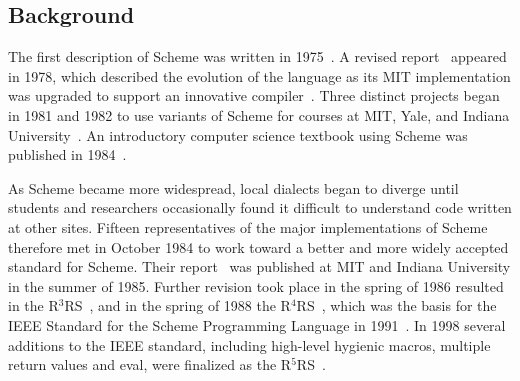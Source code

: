 \subsection*{Background}

\vest The first description of Scheme was written in
1975~\cite{Scheme75}.  A revised report~\cite{Scheme78}
 appeared in 1978, which described the evolution
of the language as its MIT implementation was upgraded to support an
innovative compiler~\cite{Rabbit}.  Three distinct projects began in
1981 and 1982 to use variants of Scheme for courses at MIT, Yale, and
Indiana University~\cite{Rees82,MITScheme,Scheme311}.  An introductory
computer science textbook using Scheme was published in
1984~\cite{SICP}.

\vest As Scheme became more widespread,
local dialects began to diverge until students and researchers
occasionally found it difficult to understand code written at other
sites.
Fifteen representatives of the major implementations of Scheme therefore
met in October 1984 to work toward a better and more widely accepted
standard for Scheme.
%
Their report~\cite{RRRS}
was published at MIT and Indiana University in the summer of 1985.
Further revision took place in the spring of 1986 resulted in the
R$^{3}$RS~\cite{R3RS},
and in the spring of 1988 the R$^{4}$RS~\cite{R4RS}, which was the basis for the
IEEE Standard for the Scheme Programming Language in 1991~\cite{IEEEScheme}.
In 1998 several additions to the IEEE standard, including high-level
hygienic macros, multiple return values and {\cf eval}, were finalized
as the R$^{5}$RS~\cite{R5RS}.

